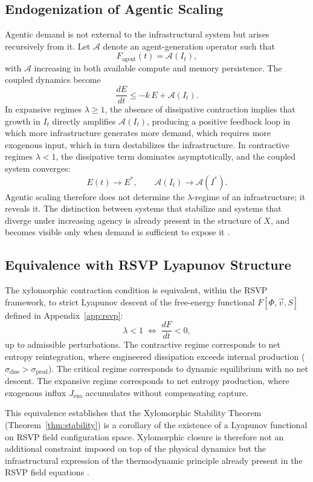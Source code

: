 \documentclass[11pt,a4paper]{article}
\theoremstyle{plain}
\theoremstyle{definition}
\theoremstyle{remark}
\begin{document}
\subsection{Endogenization of Agentic Scaling}

Agentic demand is not external to the infrastructural system but arises
recursively from it. Let $\mathcal{A}$ denote an agent-generation operator
such that
\[
  F_{\mathrm{agent}}(t) = \mathcal{A}(I_t),
\]
with $\mathcal{A}$ increasing in both available compute and memory persistence.
The coupled dynamics become
\[
  \frac{dE}{dt} \leq -k\,E + \mathcal{A}(I_t).
\]
In expansive regimes $\lambda \geq 1$, the absence of dissipative contraction
implies that growth in $I_t$ directly amplifies $\mathcal{A}(I_t)$, producing a
positive feedback loop in which more infrastructure generates more demand, which
requires more exogenous input, which in turn destabilizes the infrastructure.
In contractive regimes $\lambda < 1$, the dissipative term dominates
asymptotically, and the coupled system converges:
\[
  E(t) \to E^*, \qquad \mathcal{A}(I_t) \to \mathcal{A}(I^*).
\]
Agentic scaling therefore does not determine the $\lambda$-regime of an
infrastructure; it reveals it. The distinction between systems that stabilize
and systems that diverge under increasing agency is already present in the
structure of $X$, and becomes visible only when demand is sufficient to expose
it \citep{cheng2025}.

\subsection{Equivalence with RSVP Lyapunov Structure}

The xylomorphic contraction condition is equivalent, within the RSVP framework,
to strict Lyapunov descent of the free-energy functional $F[\Phi, \vec{v}, S]$
defined in Appendix~\ref{app:rsvp}:
\[
  \lambda < 1 \;\Longleftrightarrow\; \frac{dF}{dt} < 0,
\]
up to admissible perturbations. The contractive regime corresponds to net
entropy reintegration, where engineered dissipation exceeds internal production
($\sigma_{\mathrm{diss}} > \sigma_{\mathrm{prod}}$). The critical regime
corresponds to dynamic equilibrium with no net descent. The expansive regime
corresponds to net entropy production, where exogenous influx $J_{\mathrm{exo}}$
accumulates without compensating capture.

This equivalence establishes that the Xylomorphic Stability Theorem
(Theorem~\ref{thm:stability}) is a corollary of the existence of a Lyapunov
functional on RSVP field configuration space. Xylomorphic closure is therefore
not an additional constraint imposed on top of the physical dynamics but the
infrastructural expression of the thermodynamic principle already present in the
RSVP field equations \citep{jacobson1995,prigogine1977}.
\end{document}
